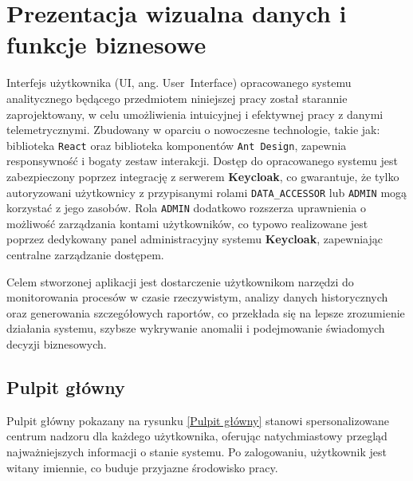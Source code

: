 \section{Prezentacja wizualna danych i funkcje biznesowe}
\label{chap:prezentacja_wizualna}

Interfejs użytkownika (UI, ang. \mbox{User Interface}) opracowanego systemu analitycznego będącego przedmiotem niniejszej pracy został starannie zaprojektowany, w celu umożliwienia intuicyjnej i efektywnej pracy z danymi telemetrycznymi. Zbudowany w oparciu o nowoczesne technologie, takie jak: biblioteka \texttt{React} oraz biblioteka komponentów \texttt{Ant Design}, zapewnia responsywność i bogaty zestaw interakcji. Dostęp do opracowanego systemu jest zabezpieczony poprzez integrację z serwerem \textbf{Keycloak}, co gwarantuje, że tylko autoryzowani użytkownicy z przypisanymi rolami \texttt{DATA\_ACCESSOR} lub \texttt{ADMIN} mogą korzystać z jego zasobów. Rola \texttt{ADMIN} dodatkowo rozszerza uprawnienia o możliwość zarządzania kontami użytkowników, co typowo realizowane jest poprzez dedykowany panel administracyjny systemu \textbf{Keycloak}, zapewniając centralne zarządzanie dostępem.

Celem stworzonej aplikacji jest dostarczenie użytkownikom narzędzi do monitorowania procesów w czasie rzeczywistym, analizy danych historycznych oraz generowania szczegółowych raportów, co przekłada się na lepsze zrozumienie działania systemu, szybsze wykrywanie anomalii i podejmowanie świadomych decyzji biznesowych.

\subsection{Pulpit główny}

Pulpit główny pokazany na rysunku \ref{Pulpit główny} stanowi spersonalizowane centrum nadzoru dla każdego użytkownika, oferując natychmiastowy przegląd najważniejszych informacji o stanie systemu. Po zalogowaniu, użytkownik jest witany imiennie, co buduje przyjazne środowisko pracy.



